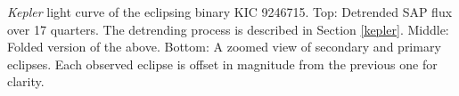 \label{fig:keplerfig} \emph{Kepler} light curve of the eclipsing binary KIC 9246715. Top: Detrended SAP flux over 17 quarters. The detrending process is described in Section \ref{kepler}. Middle: Folded version of the above. Bottom: A zoomed view of secondary and primary eclipses. Each observed eclipse is offset in magnitude from the previous one for clarity.
